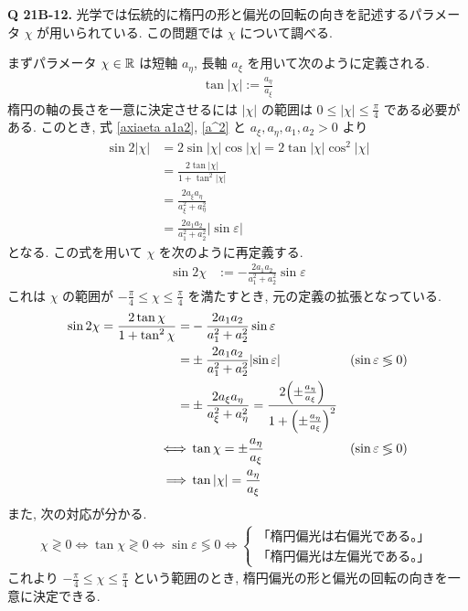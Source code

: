 \documentclass[uplatex,a4paper,dvipdfmx]{jsarticle}
\theoremstyle{definition}
\begin{document}
\textbf{Q 21B-12.}
光学では伝統的に楕円の形と偏光の回転の向きを記述するパラメータ $\chi$ が用いられている. この問題では $\chi$ について調べる.

まずパラメータ $\chi\in\mathbb{R}$ は短軸 $a_\eta$, 長軸 $a_\xi$ を用いて次のように定義される.
\begin{align}
  \tan{|\chi|} := \frac{a_\eta}{a_\xi}
\end{align}
楕円の軸の長さを一意に決定させるには $|\chi|$ の範囲は $0 \leq |\chi| \leq \frac{\pi}{4}$ である必要がある. このとき, 式 \eqref{axiaeta a1a2}, \eqref{a^2} と $a_\xi, a_\eta, a_1, a_2 > 0$ より
\begin{align}
  \sin{2|\chi|} & = 2\sin|\chi|\cos|\chi| = 2\tan|\chi|\cos^2|\chi|           \\
                & = \frac{2\tan|\chi|}{1 + \tan^2|\chi|}                      \\
                & = \frac{2a_\xi a_\eta}{a_\xi^2 + a_\eta^2}                  \\
                & = \frac{2a_1 a_2}{a_1^2 + a_2^2}\lvert\sin\varepsilon\rvert
\end{align}
となる. この式を用いて $\chi$ を次のように再定義する.
\begin{align}
  \sin{2\chi} & := -\frac{2a_1 a_2}{a_1^2 + a_2^2}\sin\varepsilon \label{chi def}
\end{align}
これは $\chi$ の範囲が $-\frac{\pi}{4} \leq \chi \leq \frac{\pi}{4}$ を満たすとき, 元の定義の拡張となっている.
\begin{align}
  \sin2\chi = \frac{2\tan\chi}{1 + \tan^2\chi}
  =        & -\frac{2a_1 a_2}{a_1^2 + a_2^2}\sin\varepsilon                                                                                                          \\
  =        & \pm\frac{2a_1 a_2}{a_1^2 + a_2^2}\lvert\sin\varepsilon\rvert                                                             & (\sin\varepsilon \lessgtr 0) \\
  =        & \pm\frac{2a_\xi a_\eta}{a_\xi^2 + a_\eta^2} = \frac{2\qty(\pm\frac{a_\eta}{a_\xi})}{1 + \qty(\pm\frac{a_\eta}{a_\xi})^2}                                \\
  \iff     & \tan\chi = \pm\frac{a_\eta}{a_\xi}                                                                                       & (\sin\varepsilon \lessgtr 0) \\
  \implies & \tan|\chi| = \frac{a_\eta}{a_\xi}
\end{align}
また, 次の対応が分かる.
\begin{align}
  \chi \gtrless 0 \iff \tan\chi \gtrless 0 \iff \sin\varepsilon \lessgtr 0 \iff
  \begin{cases}
    \textrm{「楕円偏光は右偏光である。」} \\
    \textrm{「楕円偏光は左偏光である。」}
  \end{cases}
\end{align}
これより $-\frac{\pi}{4} \leq \chi \leq \frac{\pi}{4}$ という範囲のとき, 楕円偏光の形と偏光の回転の向きを一意に決定できる. \\
\end{document}
